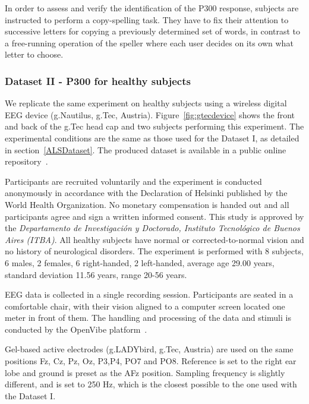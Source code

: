 In order to assess and verify the identification of the P300 response, subjects are instructed to perform a copy-spelling task. They have to fix their attention to successive letters for copying a previously determined set of words, in contrast to a free-running operation of the speller where each user decides on its own what letter to choose.

\subsubsection{Dataset II - P300 for healthy subjects}
\label{P300healthysubject}

We replicate the same experiment on healthy subjects using a wireless digital EEG device (g.Nautilus, g.Tec, Austria).  Figure~\ref{fig:gtecdevice} shows the front and back of the g.Tec head cap and two subjects performing this experiment.   The experimental conditions are the same as those used for the Dataset I, as detailed in section~\ref{ALSDataset}.  The produced dataset is available in a public online repository~\cite{owndataset}.

Participants are recruited voluntarily and the experiment is conducted anonymously in accordance with the Declaration of Helsinki published by the World Health Organization.  No monetary compensation is handed out and all participants agree and sign a written informed consent.  This study is approved by the \textit{Departamento de Investigación y Doctorado, Instituto Tecnológico de Buenos Aires (ITBA)}.  All healthy subjects have normal or corrected-to-normal vision and no history of neurological disorders. The experiment is performed with 8 subjects, 6 males, 2 females, 6 right-handed, 2 left-handed, average age 29.00 years, standard deviation  11.56 years, range 20-56 years.

EEG data is collected in a single recording session. Participants are seated in a comfortable chair, with their vision aligned to a computer screen located one meter in front of them.  The handling and processing of the data and stimuli is conducted by the OpenVibe platform~\cite{Renard2010}. 

Gel-based active electrodes (g.LADYbird, g.Tec, Austria) are used on the same positions Fz, Cz, Pz, Oz, P3,P4, PO7 and PO8.  Reference is set to the right ear lobe and ground is preset as the AFz position.   Sampling frequency is slightly different, and is set to 250 Hz, which is the closest possible to the one used with the Dataset I.



